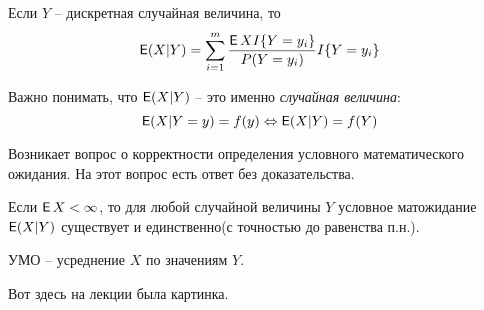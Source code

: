 \begin{remark}
Если $Y$ -- дискретная случайная величина, то
$$
\E(X|Y) = \sum_{i = 1}^{m} \frac{\E XI\{Y = y_i\}}{P(Y = y_i)}I\{Y = y_i\}
$$
\end{remark}

\begin{remark}
Важно понимать, что $\E(X|Y)$ -- это именно \emph{случайная величина}:
$$
\E(X|Y = y) = f(y) \Leftrightarrow \E(X|Y) = f(Y)
$$
\end{remark}

Возникает вопрос о корректности определения условного математического ожидания. На этот вопрос есть ответ без доказательства.
\begin{theorem}
Если $\E X < \infty$, то для любой случайной величины $Y$ условное матожидание $\E(X|Y)$ существует и единственно(с точностью до равенства п.н.).
\end{theorem}

\begin{remark}
УМО -- усреднение $X$ по значениям $Y$.
\end{remark}

\begin{example}
Вот здесь на лекции была картинка.
\end{example}

